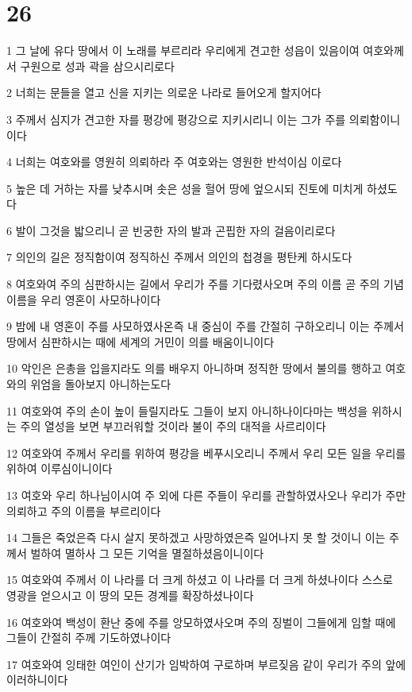 \chapter{26}

\par 1 그 날에 유다 땅에서 이 노래를 부르리라 우리에게 견고한 성읍이 있음이여 여호와께서 구원으로 성과 곽을 삼으시리로다
\par 2 너희는 문들을 열고 신을 지키는 의로운 나라로 들어오게 할지어다
\par 3 주께서 심지가 견고한 자를 평강에 평강으로 지키시리니 이는 그가 주를 의뢰함이니이다
\par 4 너희는 여호와를 영원히 의뢰하라 주 여호와는 영원한 반석이심 이로다
\par 5 높은 데 거하는 자를 낮추시며 솟은 성을 헐어 땅에 엎으시되 진토에 미치게 하셨도다
\par 6 발이 그것을 밟으리니 곧 빈궁한 자의 발과 곤핍한 자의 걸음이리로다
\par 7 의인의 길은 정직함이여 정직하신 주께서 의인의 첩경을 평탄케 하시도다
\par 8 여호와여 주의 심판하시는 길에서 우리가 주를 기다렸사오며 주의 이름 곧 주의 기념 이름을 우리 영혼이 사모하나이다
\par 9 밤에 내 영혼이 주를 사모하였사온즉 내 중심이 주를 간절히 구하오리니 이는 주께서 땅에서 심판하시는 때에 세계의 거민이 의를 배움이니이다
\par 10 악인은 은총을 입을지라도 의를 배우지 아니하며 정직한 땅에서 불의를 행하고 여호와의 위엄을 돌아보지 아니하는도다
\par 11 여호와여 주의 손이 높이 들릴지라도 그들이 보지 아니하나이다마는 백성을 위하시는 주의 열성을 보면 부끄러워할 것이라 불이 주의 대적을 사르리이다
\par 12 여호와여 주께서 우리를 위하여 평강을 베푸시오리니 주께서 우리 모든 일을 우리를 위하여 이루심이니이다
\par 13 여호와 우리 하나님이시여 주 외에 다른 주들이 우리를 관할하였사오나 우리가 주만 의뢰하고 주의 이름을 부르리이다
\par 14 그들은 죽었은즉 다시 살지 못하겠고 사망하였은즉 일어나지 못 할 것이니 이는 주께서 벌하여 멸하사 그 모든 기억을 멸절하셨음이니이다
\par 15 여호와여 주께서 이 나라를 더 크게 하셨고 이 나라를 더 크게 하셨나이다 스스로 영광을 얻으시고 이 땅의 모든 경계를 확장하셨나이다
\par 16 여호와여 백성이 환난 중에 주를 앙모하였사오며 주의 징벌이 그들에게 임할 때에 그들이 간절히 주께 기도하였나이다
\par 17 여호와여 잉태한 여인이 산기가 임박하여 구로하며 부르짖음 같이 우리가 주의 앞에 이러하니이다
